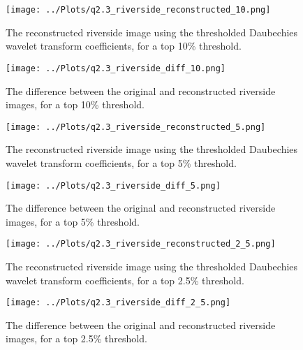 \documentclass[12pt]{report} %
\begin{document}
\begin{figure}[htbp]
    \centering
    \texttt{[image: ../Plots/q2.3\_riverside\_reconstructed\_10.png]}
    \caption{The reconstructed riverside image using the thresholded Daubechies wavelet transform coefficients, for a top 10\% threshold.}
    \label{fig:reconstructed_image10}
\end{figure}

\begin{figure}[htbp]
    \centering
    \texttt{[image: ../Plots/q2.3\_riverside\_diff\_10.png]}
    \caption{The difference between the original and reconstructed riverside images, for a top 10\% threshold.}
    \label{fig:diff_image10}
\end{figure}


\begin{figure}[htbp]
    \centering
    \texttt{[image: ../Plots/q2.3\_riverside\_reconstructed\_5.png]}
    \caption{The reconstructed riverside image using the thresholded Daubechies wavelet transform coefficients, for a top 5\% threshold.}
    \label{fig:reconstructed_image5}
\end{figure}

\begin{figure}[htbp]
    \centering
    \texttt{[image: ../Plots/q2.3\_riverside\_diff\_5.png]}
    \caption{The difference between the original and reconstructed riverside images, for a top 5\% threshold.}
    \label{fig:diff_image5}
\end{figure}

\begin{figure}[htbp]
    \centering
    \texttt{[image: ../Plots/q2.3\_riverside\_reconstructed\_2\_5.png]}
    \caption{The reconstructed riverside image using the thresholded Daubechies wavelet transform coefficients, for a top 2.5\% threshold.}
    \label{fig:reconstructed_image2.5}
\end{figure}

\begin{figure}[htbp]
    \centering
    \texttt{[image: ../Plots/q2.3\_riverside\_diff\_2\_5.png]}
    \caption{The difference between the original and reconstructed riverside images, for a top 2.5\% threshold.}
    \label{fig:diff_image2.5}
\end{figure}





\end{document}

